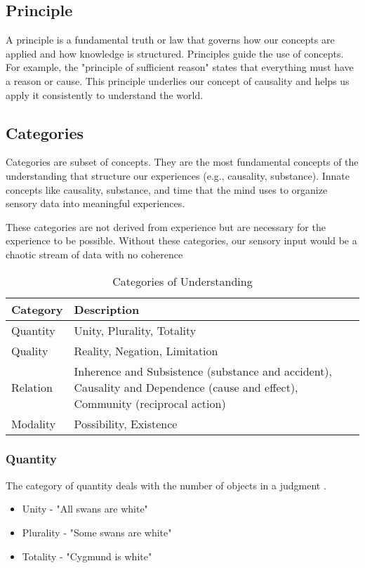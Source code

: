 \documentclass[a4paper]{article}
\begin{document}
\subsection{Principle}
A principle is a fundamental truth or law that governs how our concepts are applied and how knowledge is structured. 
Principles guide the use of concepts. 
For example, the "principle of sufficient reason" states that everything must have a reason or cause. 
This principle underlies our concept of causality and helps us apply it consistently to understand the world.

\subsection{Categories}
Categories are subset of concepts.
They are the most fundamental concepts of the understanding that structure our experiences (e.g., causality, substance).
Innate concepts like causality, substance, and time that the mind uses to organize sensory data into meaningful experiences.

These categories are not derived from experience but are necessary for the experience to be possible. 
Without these categories, our sensory input would be a chaotic stream of data with no coherence

\begin{table}[h!]
\centering
\begin{tabular}{|p{2cm}|p{10cm}|}
\hline
\textbf{Category} & \textbf{Description} \\
\hline
Quantity & Unity, Plurality, Totality \\
\hline
Quality & Reality, Negation, Limitation \\
\hline
Relation & Inherence and Subsistence (substance and accident), Causality and Dependence (cause and effect), Community (reciprocal action) \\
\hline
Modality & Possibility, Existence \\
\hline
\end{tabular}
\caption{Categories of Understanding}
\label{tab:categories}
\end{table}

\subsubsection{Quantity}
The category of quantity deals with the number of objects in a judgment \autocite{StanfordCategories}.
\begin{itemize}
    \item Unity - "All swans are white"
    \item Plurality - "Some swans are white"
    \item Totality - "Cygmund is white"
\end{itemize}
\end{document}
